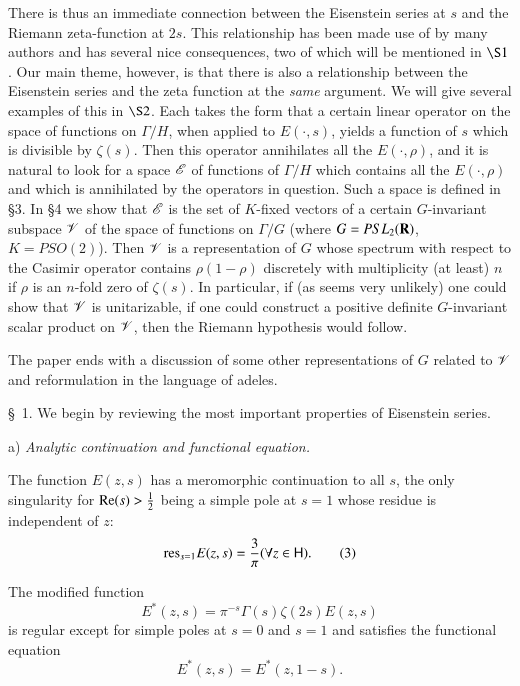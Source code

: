 There is thus an immediate connection between the Eisenstein series at $s$ and the Riemann zeta-function at $2s$. This relationship has been made use of by many authors and has several nice consequences, two of which will be mentioned in $\S 1$. Our main theme, however, is that there is also a relationship between the Eisenstein series and the zeta function at the \textit{same} argument. We will give several examples of this in $\S 2$. Each takes the form that a certain linear operator on the space of functions on $\Gamma/H$, when applied to $E(\cdot, s)$, yields a function of $s$ which is divisible by $\zeta(s)$. Then this operator annihilates all the $E (\cdot, \rho)$, and it is natural to look for a space $\mathscr{E}$ of functions of $\Gamma / H$ which contains all the $E(\cdot, \rho)$ and which is annihilated by the operators in question. Such a space is defined in \S 3. In \S 4 we show that $\mathscr{E}$ is the set of $K$-fixed vectors of a certain $G$-invariant subspace $\mathscr{V}$ of the space of functions on $\Gamma / G$ (where $G = PSL_2 (\mathbf{R})$, $K = PSO(2)$). Then $\mathscr{V}$ is a representation of $G$ whose spectrum with respect to the Casimir operator contains $\rho (1-\rho)$  discretely with multiplicity (at least) $n$ if $\rho$ is an $n$-fold zero of $\zeta(s)$. In particular, if (as seems very unlikely) one could show that $\mathscr{V}$ is unitarizable, \ie if one could construct a positive definite $G$-invariant scalar product on $\mathscr{V}$, then the Riemann hypothesis would follow.

The paper ends with a discussion of some other representations of $G$ related to $\mathscr{V}$ and reformulation in the language of adeles. 

\smallskip
\S~1. We begin by reviewing the most important properties of Eisenstein series. 

a) \textit{Analytic continuation and functional equation.}

The function $E(z,s)$ has a meromorphic continuation to all $s$, the only singularity for $\operatorname{Re} (s) > \frac{1}{2}$ being a simple pole at $s =1$ whose residue is independent of $z$:
\begin{equation*}
\mathrm{res}_{s=1} E(z,s) = \frac{3}{\pi} (\forall z \in \mathsf{H}). \tag{3}\label{art10-eq3}
\end{equation*}

The modified function
\begin{equation*}
E^\ast (z,s) = \pi^{-s} \Gamma (s) \zeta(2s) E (z,s) \tag{4}\label{art10-eq4} 
\end{equation*}
is regular except for simple poles at $s =0$ and $s =1$ and satisfies the functional equation 
\begin{equation*}
E^{\ast} (z,s) = E^\ast (z, 1 - s). \tag{5}\label{art10-eq5}
\end{equation*}

